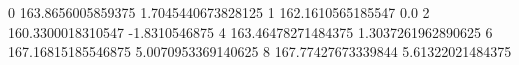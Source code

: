 0 163.8656005859375 1.7045440673828125
1 162.1610565185547 0.0
2 160.3300018310547 -1.8310546875
4 163.46478271484375 1.3037261962890625
6 167.16815185546875 5.0070953369140625
8 167.77427673339844 5.61322021484375
